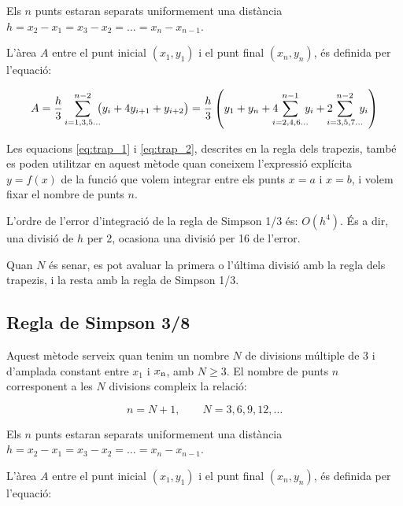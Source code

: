 Els $n$ punts estaran separats uniformement una distància $h = x_2-x_1 = x_3-x_2 = \dots = x_n-x_{n-1}$.

L'àrea $A$ entre el punt inicial $(x_1, y_1)$ i el punt final $(x_n, y_n)$, és definida per l'equació:

 \begin{equation}\label{eq:simp_1_3}
   A =  \frac{h}{3} \sum_{i=1,3,5\dots}^{n-2} \hspace{-0.5em} \big( y_i + 4 y_{i+1} + y_{i+2} \big) =
   \frac{h}{3} \left( y_1 + y_n + 4 \hspace{-0.7em} \sum_{i=2,4,6\dots}^{n-1} \hspace{-0.5em} y_i +
   2 \hspace{-0.7em} \sum_{i=3,5,7\dots}^{n-2} \hspace{-0.5em} y_i \right)
 \end{equation}

Les equacions \eqref{eq:trap_1} i \eqref{eq:trap_2}, descrites en la regla dels trapezis, també es poden utilitzar en aquest mètode quan  coneixem l'expressió explícita $y=f(x)$ de la funció que volem integrar entre els punts $x=a$ i $x=b$, i volem fixar el nombre de punts $n$.

L'ordre de l'error d'integració de la regla de Simpson 1/3 és: $O(h^4)$. És a dir, una divisió de $h$ per 2, ocasiona una divisió per 16 de l'error.

Quan $N$ és senar, es pot avaluar la primera o l'última divisió amb la  regla dels trapezis, i la resta amb la regla de Simpson 1/3.

 \subsection{Regla de Simpson 3/8}

Aquest mètode serveix quan tenim un nombre  $N$ de divisions múltiple de 3 i d'amplada constant entre $x_1$ i $x_\mathrm{n}$, amb $N \geq 3$.  El nombre de punts $n$ corresponent a les $N$ divisions  compleix la relació:

\begin{equation}
	n = N+1,\qquad N = 3, 6, 9, 12, \dots
\end{equation}
 
Els $n$ punts estaran separats uniformement una distància $h = x_2-x_1 = x_3-x_2 = \dots = x_n-x_{n-1}$.

L'àrea $A$ entre el punt inicial $(x_1, y_1)$ i el punt final $(x_n, y_n)$, és definida per l'equació:

